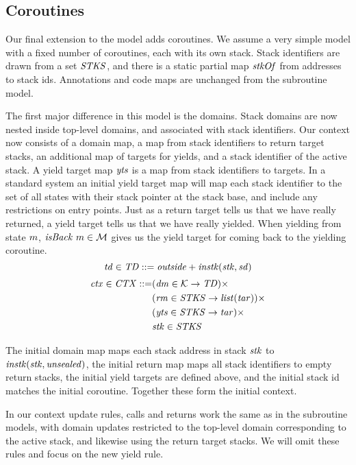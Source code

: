 \documentclass[10pt,conference]{ieeetran}%
\theoremstyle{definition}
\begin{document}
{\subsection{Coroutines}
\label{sec:coroutines}

Our final extension to the model adds coroutines. We assume a very simple model with
a fixed number of coroutines, each with its own stack.
Stack identifiers are drawn from a set \(\mathit{STKS}\), and there is a static partial map
\(\mathit{stkOf}\) from addresses to stack ids.  Annotations and code maps are unchanged from
the subroutine model.

The first major difference in this model is the domains. Stack domains are now nested inside
top-level domains, and associated with stack identifiers.
Our context now consists of a domain map, a map from stack identifiers to return target stacks,
an additional map of targets for yields, and a stack identifier of the active stack.
A yield target map \(\mathit{yts}\) is a map from stack identifiers to targets.
In a standard system an initial yield target map will map each stack identifier to the
set of all states with their stack pointer at the stack base, and include any restrictions
on entry points. Just as a return target tells us that we have really returned, a yield
target tells us that we have really yielded. When yielding from state \(m\),
\(\mathit{isBack} ~ m \in {\mathcal M}\) gives us the yield target for coming back to the yielding
coroutine.
%
\[\mathit{td} \in \mathit{TD} ::= \mathit{outside} + \mathit{instk}(\mathit{stk},\mathit{sd})\]
\[\begin{split}
\mathit{ctx} \in \mathit{CTX} ::= &
 (\mathit{dm} \in {\mathcal K} \rightarrow \mathit{TD}) \times \\
& (\mathit{rm} \in \mathit{STKS} \rightarrow \mathit{list}(\mathit{tar})) \times \\
& (\mathit{yts} \in \mathit{STKS} \rightarrow \mathit{tar}) \times \\
& \mathit{stk} \in \mathit{STKS}
\end{split}\]

The initial domain map maps each stack address in stack \(\mathit{stk}\) to
\(\mathit{instk}(\mathit{stk},\mathit{unsealed})\), the initial return map maps all stack identifiers to empty
return stacks, the initial yield targets are defined above, and the initial stack id matches the initial
coroutine. Together these form the initial context.

In our context update rules, calls and returns work the same as in the subroutine models,
with domain updates restricted to the top-level domain corresponding to the active stack,
and likewise using the return target stacks. We will omit these rules and focus on the new yield rule.

}
\end{document}
